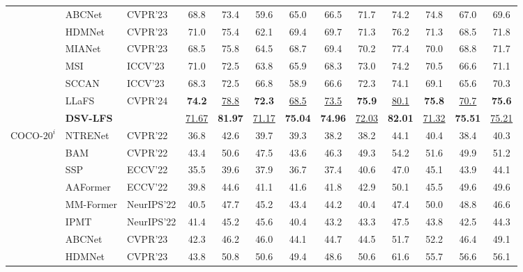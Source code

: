 \begin{table}[ht!]
{\begin{tabular}{@{}p{1.5cm}|p{2.5cm}|p{1.7cm}|c |c |c |c ||c| c |c |c |c ||c@{}}
& ABCNet \cite{wang2023rethinking} & CVPR'23 & 68.8 & 73.4 & 59.6 & 65.0 & 66.5 & 71.7 & 74.2 & 74.8 & 67.0 & 69.6 \\
& HDMNet \cite{peng2023hierarchical} & CVPR'23 & 71.0 & 75.4 & 62.1 & 69.4 & 69.7 & 71.3 & 76.2 & 71.3 & 68.5 & 71.8 \\
& MIANet \cite{yang2023mianet} & CVPR'23 & 68.5 & 75.8 & 64.5 & 68.7 & 69.4 & 70.2 & 77.4 & 70.0 & 68.8 & 71.7 \\
& MSI \cite{moon2023msi} & ICCV'23 & 71.0 & 72.5 & 63.8 & 65.9 & 68.3 & 73.0 & 74.2 & 70.5 & 66.6 & 71.1 \\
& SCCAN \cite{xu2023self} & ICCV'23 & 68.3 & 72.5 & 66.8 & 58.9 & 66.6 & 72.3 & 74.1 & 69.1 & 65.6 & 70.3 \\
& LLaFS \cite{zhu2023llafs}& CVPR’24 & \textbf{74.2} & \underline{78.8} & \textbf{72.3} & \underline{68.5} & \underline{73.5} & \textbf{75.9} & \underline{80.1} & \textbf{75.8} & \underline{70.7} & \textbf{75.6} \\
\rowcolor[HTML]{D9EAD3}
& \textbf{DSV-LFS} &  & \underline{71.67} & \textbf{81.97} & \underline{71.17} &  \textbf{75.04} &\cellcolor[gray]{0.7} \textbf{74.96} & \underline{72.03} & \textbf{82.01} & \underline{71.32} & \textbf{75.51} & \cellcolor[gray]{0.7} \underline{75.21} \\
\hline
\hline
\multirow{13}{*}{COCO-$20^{i}$} & NTRENet \cite{liu2022learning} & CVPR'22 & 36.8 & 42.6 & 39.7 & 39.3 & 38.2 & 38.2 & 44.1 & 40.4 & 38.4 & 40.3 \\
& BAM \cite{lang2022learning} & CVPR'22 & 43.4 & 50.6 & 47.5 & 43.6 & 46.3 & 49.3 & 54.2 & 51.6 & 49.9 & 51.2 \\
& SSP \cite{fan2022self} & ECCV'22 & 35.5 & 39.6 & 37.9 & 36.7 & 37.4 & 40.6 & 47.0 & 45.1 & 43.9 & 44.1 \\
& AAFormer \cite{wang2022adaptive} & ECCV'22 & 39.8 & 44.6 & 41.1 & 41.6 & 41.8 & 42.9 & 50.1 & 45.5 & 49.6 & 49.6 \\
& MM-Former \cite{zhang2022mask} & NeurIPS'22 & 40.5 & 47.7 & 45.2 & 43.4 & 44.2 & 40.4 & 47.4 & 50.0 & 48.8 & 46.6 \\
& IPMT \cite{liu2022intermediate} & NeurIPS'22 & 41.4 & 45.2 & 45.6 & 40.4 & 43.2 & 43.3 & 47.5 & 43.8 & 42.5 & 44.3 \\
& ABCNet \cite{wang2023rethinking} & CVPR'23 & 42.3 & 46.2 & 46.0 & 44.1 & 44.7 & 44.5 & 51.7 & 52.2 & 46.4 & 49.1 \\
& HDMNet \cite{peng2023hierarchical} & CVPR'23 & 43.8 & 50.8 & 50.6 & 49.4 & 48.6 & 50.6 & 61.6 & 55.7 & 56.6 & 56.1 \\

\end{tabular}}
\end{table}
